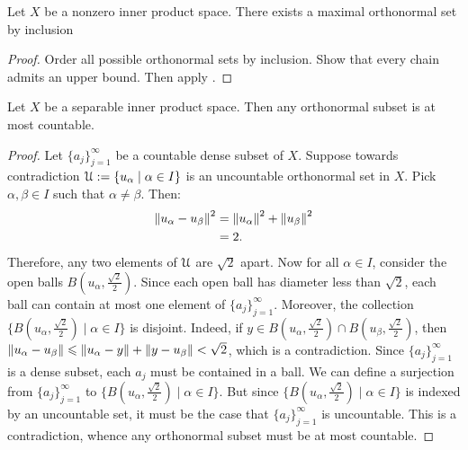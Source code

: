 \begin{theorem}
    Let $X$ be a nonzero inner product space. There exists a maximal orthonormal set by inclusion
\end{theorem}
    \begin{proof}
        Order all possible orthonormal sets by inclusion. Show that every chain admits an upper bound. Then apply .
    \end{proof}

\begin{theorem}
    Let $X$ be a separable inner product space. Then any orthonormal subset is at most countable.
\end{theorem}
    \begin{proof}
        Let $\{a_j\}_{j = 1}^\infty$ be a countable dense subset of $X$. Suppose towards contradiction $\mathcal{U}:= \{u_\alpha \mid \alpha \in I\}$ is an uncountable orthonormal set in $X$. Pick $\alpha,\beta \in I$ such that $\alpha \neq \beta$. Then:
            \begin{equation*}
            \begin{split}
                \left\lVert u_\alpha - u_\beta \right\rVert^2 
                & = \left\lVert u_\alpha \right\rVert^2 + \left\lVert u_\beta \right\rVert^2 \\
                & = 2.
            \end{split}
            \end{equation*}
        Therefore, any two elements of $\mathcal{U}$ are $\sqrt{2}$ apart. Now for all $\alpha \in I$, consider the open balls $B(u_\alpha, \frac{\sqrt{2}}{2})$. Since each open ball has diameter less than $\sqrt{2}$, each ball can contain at most one element of $\{a_j\}_{j = 1}^\infty$. Moreover, the collection $\{B(u_\alpha, \frac{\sqrt{2}}{2}) \mid \alpha \in I\}$ is disjoint. Indeed, if $y \in B(u_\alpha, \frac{\sqrt{2}}{2}) \cap B(u_\beta, \frac{\sqrt{2}}{2})$, then $\left\lVert u_\alpha - u_\beta \right\rVert \leqslant \left\lVert u_\alpha - y \right\rVert + \left\lVert y - u_\beta \right\rVert< \sqrt{2}$, which is a contradiction. Since $\{a_j\}_{j = 1}^\infty$ is a dense subset, each $a_j$ must be contained in a ball. We can define a surjection from $\{a_j\}_{j = 1}^\infty$ to $\{B(u_\alpha, \frac{\sqrt{2}}{2}) \mid \alpha \in I\}$. But since $\{B(u_\alpha, \frac{\sqrt{2}}{2}) \mid \alpha \in I\}$ is indexed by an uncountable set, it must be the case that $\{a_j\}_{j = 1}^\infty$ is uncountable. This is a contradiction, whence any orthonormal subset must be at most countable.
    \end{proof}

